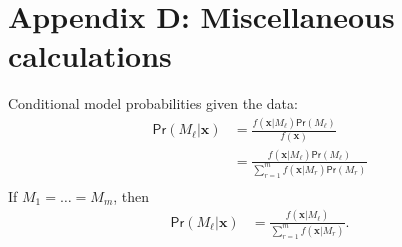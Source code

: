 \documentclass[11pt]{article}
\newcommand*\ba{\[ \begin{aligned}}
\newcommand*\ea{\end{aligned} \]}
\newcommand*\bx{\mathbf{x}}
\renewcommand\;{\,}
\renewcommand\Pr[1]{ \mathsf{Pr}\left(#1\right) }
\begin{document}
\section*{Appendix D: Miscellaneous calculations}
Conditional model probabilities given the data:
\ba
\Pr{M_\ell | \bx} & = \frac{f(\bx | M_\ell) \Pr{M_\ell}}{ f(\bx) } \\
	& = \frac{f(\bx | M_\ell) \Pr{M_\ell}}{ \sum_{r = 1}^m f(\bx | M_r) \Pr{M_r} } \\
\ea
If $M_1 = \dotsc = M_m$, then
\ba
\Pr{M_\ell | \bx} & = \frac{f(\bx | M_\ell)}{ \sum_{r=1}^m f(\bx | M_r) }.
\ea
\end{document}
